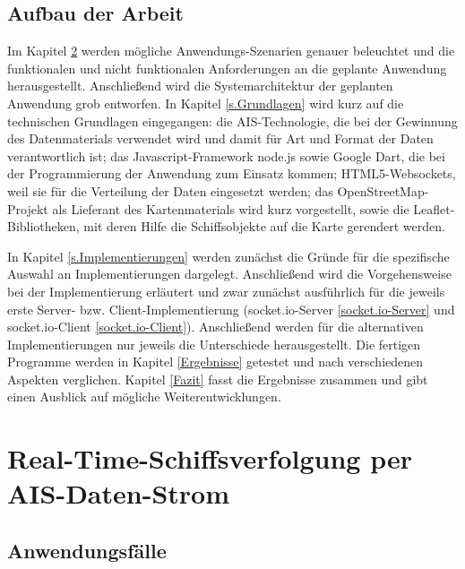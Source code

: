 \section{Aufbau der Arbeit}\label{s.Aufbau der Arbeit}
Im Kapitel \ref{c.Realtime-Schiffsverfolgung per AIS-Daten-Strom} werden mögliche Anwendungs-Szenarien genauer beleuchtet und die funktionalen und nicht funktionalen Anforderungen an die geplante Anwendung herausgestellt. Anschließend wird die Systemarchitektur der geplanten Anwendung grob entworfen.
In Kapitel \ref{s.Grundlagen} wird kurz auf die technischen Grundlagen eingegangen: die AIS-Technologie, die bei der Gewinnung des Datenmaterials verwendet wird und damit für Art und Format der Daten verantwortlich ist; das Javascript-Framework node.js sowie Google Dart, die bei der Programmierung der Anwendung zum Einsatz kommen; HTML5-Websockets, weil sie für die Verteilung der Daten eingesetzt werden; das OpenStreetMap-Projekt als Lieferant des Kartenmaterials wird kurz vorgestellt, sowie die Leaflet-Bibliotheken, mit deren Hilfe die Schiffsobjekte auf die Karte gerendert werden.

In Kapitel \ref{s.Implementierungen} werden zunächst die Gründe für die spezifische Auswahl an Implementierungen dargelegt. Anschließend wird die Vorgehensweise bei der Implementierung erläutert und zwar zunächst ausführlich für die jeweils erste Server- bzw. Client-Implementierung (socket.io-Server \ref{socket.io-Server} und socket.io-Client \ref{socket.io-Client}). Anschließend werden für die alternativen Implementierungen nur jeweils die Unterschiede herausgestellt. Die fertigen Programme werden in Kapitel \ref{Ergebnisse} getestet und nach verschiedenen Aspekten verglichen.
Kapitel \ref{Fazit} fasst die Ergebnisse zusammen und gibt einen Ausblick auf mögliche Weiterentwicklungen.


\chapter{Real-Time-Schiffsverfolgung per AIS-Daten-Strom}\label{c.Realtime-Schiffsverfolgung per AIS-Daten-Strom}

\section{ Anwendungsfälle}\label{s.Anwendungsfälle}

